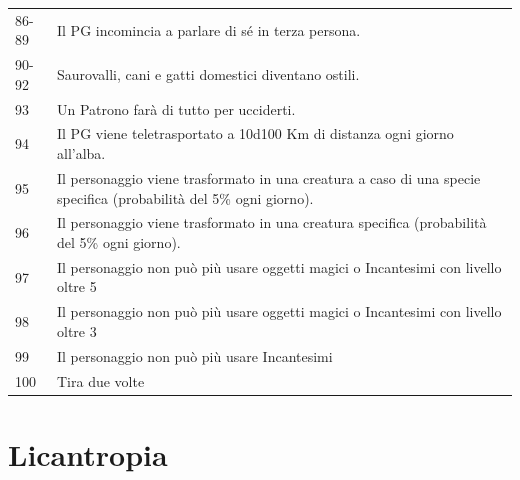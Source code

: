 \begin{tabularx}{\linewidth}{lX}
\rowcolor{gray!20}86-89& Il PG incomincia a parlare di sé in terza persona.\\
90-92& Saurovalli, cani e gatti domestici diventano ostili.\\
\rowcolor{gray!20}93& Un Patrono farà di tutto per ucciderti.\\
94& Il PG viene teletrasportato a 10d100 Km di distanza ogni giorno all'alba.\\
\rowcolor{gray!20}95& Il personaggio viene trasformato in una creatura a caso di una specie specifica (probabilità del 5\% ogni giorno).\\
96& Il personaggio viene trasformato in una creatura specifica (probabilità del 5\% ogni giorno).\\
\rowcolor{gray!20}97& Il personaggio non può più usare oggetti magici o Incantesimi con livello oltre 5\\
98& Il personaggio non può più usare oggetti magici o Incantesimi con livello oltre 3\\
\rowcolor{gray!20}99& Il personaggio non può più usare Incantesimi\\
100 & Tira due volte
\end{tabularx}

\pagebreak

\section*{Licantropia}\label{Licantropia}\hypertarget{Licantropia}{}

